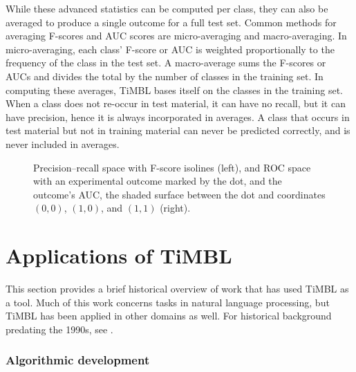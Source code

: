 \documentclass{book}
\begin{document}
While these advanced statistics can be computed per class, they can
also be averaged to produce a single outcome for a full test
set. Common methods for averaging F-scores and AUC scores are
micro-averaging and macro-averaging. In micro-averaging, each class'
F-score or AUC is weighted proportionally to the frequency of the
class in the test set. A macro-average sums the F-scores or AUCs
and divides the total by the number of classes in the training set. In
computing these averages, TiMBL bases itself on the classes in the
training set. When a class does not re-occur in test material, it can
have no recall, but it can have precision, hence it is always
incorporated in averages. A class that occurs in test material but not
in training material can never be predicted correctly, and is never
included in averages.

\begin{figure}
\begin{center}

\begin{minipage}[t]{0.53\textwidth}
\end{minipage}\hfill
\begin{minipage}[t]{0.47\textwidth}
\end{minipage}

\end{center}
\caption{Precision--recall space with F-score isolines (left), and ROC
  space with an experimental outcome marked by the dot, and the
  outcome's AUC, the shaded surface between the dot and coordinates
  $(0,0)$, $(1,0)$, and $(1,1)$ (right). \label{spaces}}
\end{figure}



\section{Applications of TiMBL}
\label{furtherreading}

This section provides a brief historical overview of work that has
used TiMBL as a tool. Much of this work concerns tasks in natural
language processing, but TiMBL has been applied in other domains as
well. For historical background predating the 1990s, see
\cite{Daelemans+05}.

\subsubsection{Algorithmic development}
\end{document}
